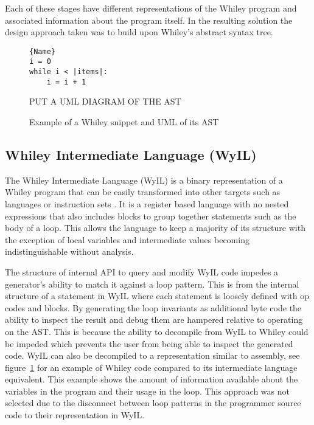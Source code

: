 Each of these stages have different representations of the Whiley program and
associated information about the program itself.
In the resulting solution the design approach taken was to build upon 
Whiley's abstract syntax tree.


\begin{figure}
\noindent\begin{minipage}{.45\textwidth}
\begin{lstlisting}[caption={Whiley Code},frame=tlrb,numbers=none]{Name}
i = 0
while i < |items|:
    i = i + 1
\end{lstlisting}
\end{minipage}\hfill
\begin{minipage}{.45\textwidth}
    PUT A UML DIAGRAM OF THE AST
\end{minipage}
    \label{lst:design-wyil}
    \caption{Example of a Whiley snippet and UML of its AST}
\end{figure}

\subsection{Whiley Intermediate Language (WyIL)}

The Whiley Intermediate Language (WyIL) is a binary representation of a Whiley program
that can be easily transformed into other targets such as languages or
instruction sets \cite{wyil}.
It is a register based language with no nested expressions 
that also includes blocks to group together statements such as the body of a loop.
This allows the language to keep a majority of its structure with the 
exception of local variables and intermediate values becoming indistinguishable 
without analysis.

The structure of internal API to query and modify WyIL code impedes a
generator's ability to match it against a loop pattern.
This is from the internal structure of a statement in WyIL where each
statement is loosely defined with op codes and blocks.
By generating the loop invariants as additional byte code the ability to
inspect the result and debug them are hampered relative to operating on the
AST.  This is because the ability to decompile from WyIL to Whiley could
be impeded which prevents the user from being able to inspect the generated
code. 
WyIL can also be decompiled to a representation similar to assembly, see
figure~\ref{lst:design-wyil} for an example of Whiley code compared to its
intermediate language equivalent.
This example shows the amount of information available about the variables
in the program and their usage in the loop.
This approach was not selected due to the disconnect between loop patterns
in the programmer source code to their representation in WyIL.



